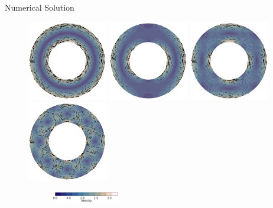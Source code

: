 \documentclass[10pt,aspectratio=169]{beamer}
\begin{document}
\begin{frame}{Numerical Solution}
	\vspace{-0.32in}
	\begin{figure}[!htb]
		\begin{multicols}{4}
			\includegraphics[width=3.5cm]{./model_k_0_res_32_vdeg_2_pdeg_1_pcont_True_vel_penalty_1.0e+08_stokes_tol_1.0e-10/vel_uw.png}\par
			\hspace{0.75in}
			\includegraphics[width=3.5cm]{./model_k_1_res_32_vdeg_2_pdeg_1_pcont_True_vel_penalty_1.0e+08_stokes_tol_1.0e-10/vel_uw.png}\par
			\hspace{1.5in}
			\includegraphics[width=3.5cm]{./model_k_2_res_32_vdeg_2_pdeg_1_pcont_True_vel_penalty_1.0e+08_stokes_tol_1.0e-10/vel_uw.png}\par
			\hspace{2.25in}
			\includegraphics[width=3.5cm]{./model_k_4_res_32_vdeg_2_pdeg_1_pcont_True_vel_penalty_1.0e+08_stokes_tol_1.0e-10/vel_uw.png}
		\end{multicols}
		\vspace{-0.29in}
		\begin{figure}
			\hspace{0.1in} 
			\includegraphics[width=3cm]{./model_k_0_res_32_vdeg_2_pdeg_1_pcont_True_vel_penalty_1.0e+08_stokes_tol_1.0e-10/v_ana_cbhorz.pdf}
		\end{figure}
	\end{figure}
	

\end{frame}
\end{document}
